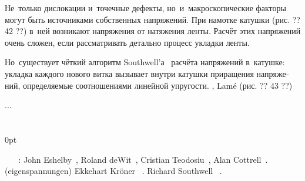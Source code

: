 \begin{otherlanguage}{russian}

Не~только дислокации и~точечные дефекты, но~и~макроскопические факторы могут быть источниками собственных напряжений.
При намотке катушки (рис. ?? 42 ??) в~ней возникают напряжения от натяжения ленты.
Расчёт этих напряжений очень сложен, если рассматривать детально процесс укладки ленты.

Но~существует чёткий алгоритм Southwell’а~\cite{southwell-introductiontotheoryofelasticity} расчёта напряжений в~катушке: укладка каждого нового витка вызывает внутри катушки приращения напряжений, определяемые соотношениями линейной упругости.
,    Lam\'{e}    (рис. ?? 43 ??)

...



\end{otherlanguage}

\section*{\small \wordforbibliography}

\begin{changemargin}{\parindent}{0pt}
\fontsize{10}{12}\selectfont

 ~ ~   :
John Eshelby~\cite{eshelby-theoryofdislocations},
Roland deWit~\cite{dewit-disclinations},
Cristian Teodosiu~\cite{teodosiu-crystaldefects},
Alan Cottrell~\cite{cottrell-dislocations}.
 (eigenspannungen)   Ekkehart Kröner ~\cite{kroener-kontinuumstheorie}.
   Richard Southwell ~\cite{southwell-introductiontotheoryofelasticity}.

\end{changemargin}
